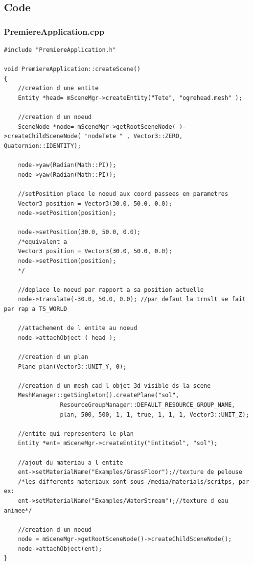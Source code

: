\documentclass[10pt,a4paper]{report}
\begin{document}
\subsection{Code}

\subsubsection{PremiereApplication.cpp}
\begin{lstlisting}[caption={PremiereApplication.cpp: Cr\'eation d'un sol}]
#include "PremiereApplication.h"

void PremiereApplication::createScene()
{
    //creation d une entite
    Entity *head= mSceneMgr->createEntity("Tete", "ogrehead.mesh" );
    
    //creation d un noeud
    SceneNode *node= mSceneMgr->getRootSceneNode( )->createChildSceneNode( "nodeTete " , Vector3::ZERO, Quaternion::IDENTITY);
    
    node->yaw(Radian(Math::PI));
    node->yaw(Radian(Math::PI));

    //setPosition place le noeud aux coord passees en parametres
    Vector3 position = Vector3(30.0, 50.0, 0.0);
    node->setPosition(position);

    node->setPosition(30.0, 50.0, 0.0); 
    /*equivalent a
    Vector3 position = Vector3(30.0, 50.0, 0.0);
    node->setPosition(position);
    */

    //deplace le noeud par rapport a sa position actuelle
    node->translate(-30.0, 50.0, 0.0); //par defaut la trnslt se fait par rap a TS_WORLD
   
    //attachement de l entite au noeud
    node->attachObject ( head );

    //creation d un plan
    Plane plan(Vector3::UNIT_Y, 0);

    //creation d un mesh cad l objet 3d visible ds la scene
    MeshManager::getSingleton().createPlane("sol",
                ResourceGroupManager::DEFAULT_RESOURCE_GROUP_NAME,
                plan, 500, 500, 1, 1, true, 1, 1, 1, Vector3::UNIT_Z); 

    //entite qui representera le plan
    Entity *ent= mSceneMgr->createEntity("EntiteSol", "sol");

    //ajout du materiau a l entite
    ent->setMaterialName("Examples/GrassFloor");//texture de pelouse
    /*les differents materiaux sont sous /media/materials/scritps, par ex:
    ent->setMaterialName("Examples/WaterStream");//texture d eau animee*/

    //creation d un noeud
    node = mSceneMgr->getRootSceneNode()->createChildSceneNode();
    node->attachObject(ent);
}


\end{lstlisting}
\end{document}
